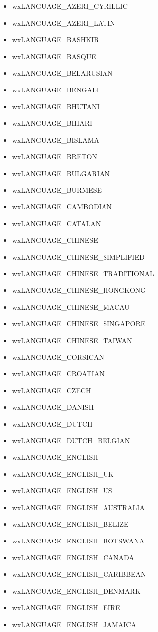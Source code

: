 \begin{itemize}
\item wxLANGUAGE\_AZERI\_CYRILLIC
\item wxLANGUAGE\_AZERI\_LATIN
\item wxLANGUAGE\_BASHKIR
\item wxLANGUAGE\_BASQUE
\item wxLANGUAGE\_BELARUSIAN
\item wxLANGUAGE\_BENGALI
\item wxLANGUAGE\_BHUTANI
\item wxLANGUAGE\_BIHARI
\item wxLANGUAGE\_BISLAMA
\item wxLANGUAGE\_BRETON
\item wxLANGUAGE\_BULGARIAN
\item wxLANGUAGE\_BURMESE
\item wxLANGUAGE\_CAMBODIAN
\item wxLANGUAGE\_CATALAN
\item wxLANGUAGE\_CHINESE
\item wxLANGUAGE\_CHINESE\_SIMPLIFIED
\item wxLANGUAGE\_CHINESE\_TRADITIONAL
\item wxLANGUAGE\_CHINESE\_HONGKONG
\item wxLANGUAGE\_CHINESE\_MACAU
\item wxLANGUAGE\_CHINESE\_SINGAPORE
\item wxLANGUAGE\_CHINESE\_TAIWAN
\item wxLANGUAGE\_CORSICAN
\item wxLANGUAGE\_CROATIAN
\item wxLANGUAGE\_CZECH
\item wxLANGUAGE\_DANISH
\item wxLANGUAGE\_DUTCH
\item wxLANGUAGE\_DUTCH\_BELGIAN
\item wxLANGUAGE\_ENGLISH
\item wxLANGUAGE\_ENGLISH\_UK
\item wxLANGUAGE\_ENGLISH\_US
\item wxLANGUAGE\_ENGLISH\_AUSTRALIA
\item wxLANGUAGE\_ENGLISH\_BELIZE
\item wxLANGUAGE\_ENGLISH\_BOTSWANA
\item wxLANGUAGE\_ENGLISH\_CANADA
\item wxLANGUAGE\_ENGLISH\_CARIBBEAN
\item wxLANGUAGE\_ENGLISH\_DENMARK
\item wxLANGUAGE\_ENGLISH\_EIRE
\item wxLANGUAGE\_ENGLISH\_JAMAICA

\end{itemize}
